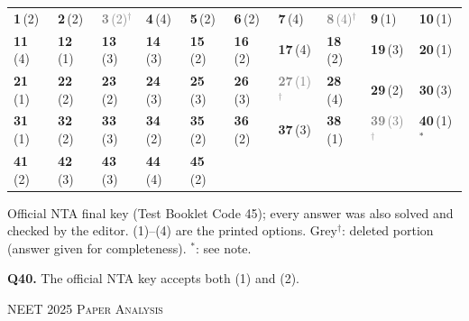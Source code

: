 {\small\setlength{\tabcolsep}{1pt}\renewcommand{\arraystretch}{1.5}
\begin{tabularx}{\linewidth}{@{}*{10}{>{\centering\arraybackslash}X}@{}}\toprule
\textbf{1}\,(2) & \textbf{2}\,(2) & \textcolor{gray}{\textbf{3}\,(2)$^{\dagger}$} & \textbf{4}\,(4) & \textbf{5}\,(2) & \textbf{6}\,(2) & \textbf{7}\,(4) & \textcolor{gray}{\textbf{8}\,(4)$^{\dagger}$} & \textbf{9}\,(1) & \textbf{10}\,(1)\\
\textbf{11}\,(4) & \textbf{12}\,(1) & \textbf{13}\,(3) & \textbf{14}\,(3) & \textbf{15}\,(2) & \textbf{16}\,(2) & \textbf{17}\,(4) & \textbf{18}\,(2) & \textbf{19}\,(3) & \textbf{20}\,(1)\\
\textbf{21}\,(1) & \textbf{22}\,(2) & \textbf{23}\,(2) & \textbf{24}\,(3) & \textbf{25}\,(3) & \textbf{26}\,(3) & \textcolor{gray}{\textbf{27}\,(1)$^{\dagger}$} & \textbf{28}\,(4) & \textbf{29}\,(2) & \textbf{30}\,(3)\\
\textbf{31}\,(1) & \textbf{32}\,(2) & \textbf{33}\,(3) & \textbf{34}\,(2) & \textbf{35}\,(2) & \textbf{36}\,(2) & \textbf{37}\,(3) & \textbf{38}\,(1) & \textcolor{gray}{\textbf{39}\,(3)$^{\dagger}$} & \textbf{40}\,(1)$^{*}$\\
\textbf{41}\,(2) & \textbf{42}\,(3) & \textbf{43}\,(3) & \textbf{44}\,(4) & \textbf{45}\,(2) &  &  &  &  & \\\bottomrule\end{tabularx}}\par\smallskip
{\footnotesize Official NTA final key (Test Booklet Code 45); every answer was also solved and checked by the editor. (1)--(4) are the printed options. {\color{gray}Grey$^{\dagger}$}: deleted portion (answer given for completeness). $^{*}$: see note.\par
\par\smallskip\textbf{Q40.} The official NTA key accepts both (1) and (2).
}\par
\clearpage
\begin{center}{}\par
{\fontsize{20}{24}\selectfont\color{navy}\scshape NEET 2025 \textperiodcentered{} Paper Analysis}\par
{\color{gilt}}\end{center}
\vspace{4pt}
